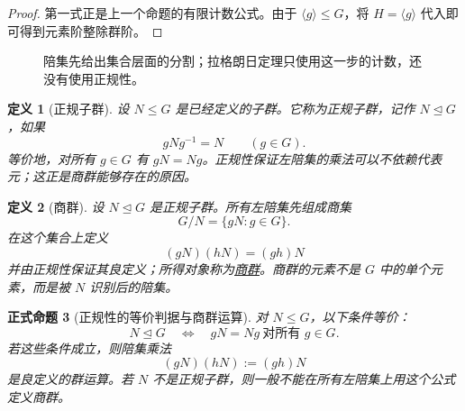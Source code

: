 \documentclass[UTF8,fontset=none,a4paper,11pt]{ctexart}
\theoremstyle{foundation-definition}
\newtheorem{definition}{定义}[section]
\theoremstyle{foundation-theorem}
\theoremstyle{foundation-proposition}
\newtheorem{proposition}[definition]{正式命题}
\theoremstyle{foundation-example}
\theoremstyle{foundation-remark}
\theoremstyle{foundation-theorem}
\newcommand{\term}[2]{\hyperref[#1]{#2}}
\begin{document}
\begin{proof}
第一式正是上一个命题的有限计数公式。由于 \(\langle g\rangle\leq G\)，将
\(H=\langle g\rangle\) 代入即可得到元素阶整除群阶。
\end{proof}

\begin{figure}[htbp]
\centering
{}
\caption{陪集先给出集合层面的分割；拉格朗日定理只使用这一步的计数，还没有使用正规性。}
\label{fig:coset-partition-lagrange}
\end{figure}

\begin{definition}[正规子群]\label{def:normal-subgroup}
设 \(N\leq G\) 是已经定义的子群。它称为正规子群，记作 \(N\trianglelefteq G\)，如果
\[
gNg^{-1}=N\qquad(g\in G).
\]
等价地，对所有 \(g\in G\) 有 \(gN=Ng\)。正规性保证左陪集的乘法可以不依赖代表元；这正是商群能够存在的原因。
\end{definition}

\begin{definition}[商群]\label{def:quotient-group}
设 \(N\trianglelefteq G\) 是正规子群。所有左陪集先组成商集
\[
G/N=\{gN:g\in G\}.
\]
在这个集合上定义
\[
(gN)(hN)=(gh)N
\]
并由正规性保证其良定义；所得对象称为\term{def:quotient-group}{商群}。商群的元素不是 \(G\) 中的单个元素，而是被 \(N\) 识别后的陪集。
\end{definition}

\begin{proposition}[正规性的等价判据与商群运算]\label{prop:normal-quotient}
对 \(N\leq G\)，以下条件等价：
\[
N\trianglelefteq G
\quad\Longleftrightarrow\quad
gN=Ng\ \text{对所有 }g\in G.
\]
若这些条件成立，则陪集乘法
\[
(gN)(hN):=(gh)N
\]
是良定义的群运算。若 \(N\) 不是正规子群，则一般不能在所有左陪集上用这个公式定义商群。
\end{proposition}
\end{document}
